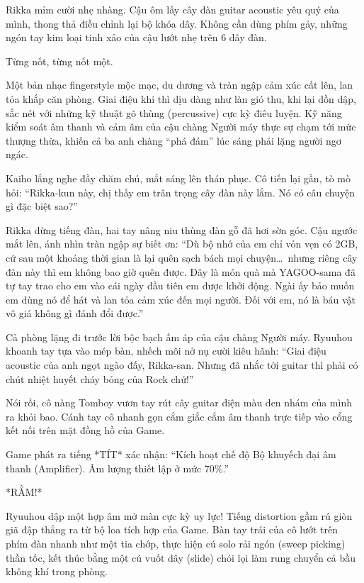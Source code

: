 \documentclass[../main.tex]{subfiles}
\begin{document}
Rikka mỉm cười nhẹ nhàng. Cậu ôm lấy cây đàn guitar acoustic yêu quý của mình, thong thả điều chỉnh lại bộ khóa dây. Không cần dùng phím gảy, những ngón tay kim loại tinh xảo của cậu lướt nhẹ trên 6 dây đàn.

Từng nốt, từng nốt một.

Một bản nhạc fingerstyle mộc mạc, du dương và tràn ngập cảm xúc cất lên, lan tỏa khắp căn phòng. Giai điệu khi thì dịu dàng như làn gió thu, khi lại dồn dập, sắc nét với những kỹ thuật gõ thùng (percussive) cực kỳ điêu luyện. Kỹ năng kiểm soát âm thanh và cảm âm của cậu chàng Người máy thực sự chạm tới mức thượng thừa, khiến cả ba anh chàng ``phá đám'' lúc sáng phải lặng người ngơ ngác.

Kaiho lắng nghe đầy chăm chú, mắt sáng lên thán phục. Cô tiến lại gần, tò mò hỏi: ``Rikka-kun này, chị thấy em trân trọng cây đàn này lắm. Nó có câu chuyện gì đặc biệt sao?''

Rikka dừng tiếng đàn, hai tay nâng niu thùng đàn gỗ đã hơi sờn góc. Cậu ngước mắt lên, ánh nhìn tràn ngập sự biết ơn: ``Dù bộ nhớ của em chỉ vỏn vẹn có 2GB, cứ sau một khoảng thời gian là lại quên sạch bách mọi chuyện\dots\ nhưng riêng cây đàn này thì em không bao giờ quên được. Đây là món quà mà YAGOO-sama đã tự tay trao cho em vào cái ngày đầu tiên em được khởi động. Ngài ấy bảo muốn em dùng nó để hát và lan tỏa cảm xúc đến mọi người. Đối với em, nó là báu vật vô giá không gì đánh đổi được.''

Cả phòng lặng đi trước lời bộc bạch ấm áp của cậu chàng Người máy. Ryuuhou khoanh tay tựa vào mép bàn, nhếch môi nở nụ cười kiêu hãnh: ``Giai điệu acoustic của anh ngọt ngào đấy, Rikka-san. Nhưng đã nhắc tới guitar thì phải có chút nhiệt huyết cháy bỏng của Rock chứ!''

Nói rồi, cô nàng Tomboy vươn tay rút cây guitar điện màu đen nhám của mình ra khỏi bao. Cánh tay cô nhanh gọn cắm giắc cắm âm thanh trực tiếp vào cổng kết nối trên mặt đồng hồ của Game.

Game phát ra tiếng *TÍT* xác nhận: ``Kích hoạt chế độ Bộ khuyếch đại âm thanh (Amplifier). Âm lượng thiết lập ở mức 70\%.''

*RẰM!*

Ryuuhou dập một hợp âm mở màn cực kỳ uy lực! Tiếng distortion gầm rú giòn giã đập thẳng ra từ bộ loa tích hợp của Game. Bàn tay trái của cô lướt trên phím đàn nhanh như một tia chớp, thực hiện cú solo rải ngón (sweep picking) thần tốc, kết thúc bằng một cú vuốt dây (slide) chói lọi làm rung chuyển cả bầu không khí trong phòng.
\end{document}
